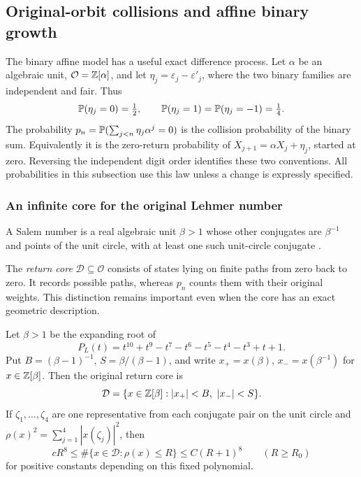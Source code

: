 \subsection{Original-orbit collisions and affine binary growth}
\label{sec:returns}

The binary affine model has a useful exact difference process.
Let $\alpha$ be an algebraic unit, $\mathcal O=\mathbb Z[\alpha]$, and let $\eta_j=\varepsilon_j-\varepsilon'_j$, where the two binary families are independent and fair.
Thus
\[
 \mathbb P(\eta_j=0)=\tfrac12,\qquad
 \mathbb P(\eta_j=1)=\mathbb P(\eta_j=-1)=\tfrac14.
\]
The probability $p_n=\mathbb P(\sum_{j<n}\eta_j\alpha^j=0)$ is the collision probability of the binary sum.
Equivalently it is the zero-return probability of $X_{j+1}=\alpha X_j+\eta_j$, started at zero.
Reversing the independent digit order identifies these two conventions.
All probabilities in this subsection use this law unless a change is expressly specified.

\subsubsection{An infinite core for the original Lehmer number}
\label{ret:core}

A Salem number is a real algebraic unit $\beta>1$ whose other conjugates are $\beta^{-1}$ and points of the unit circle, with at least one such unit-circle conjugate \cite[\S8]{Smy08}.
\begin{definition}\label{ret:return-core}
The \emph{return core} $\mathcal D\subseteq\mathcal O$ consists of states lying on finite paths from zero back to zero.
It records possible paths, whereas $p_n$ counts them with their original weights.
This distinction remains important even when the core has an exact geometric description.
\end{definition}

\begin{theorem}\label{ret:lehmer-core}
Let $\beta>1$ be the expanding root of
\[
 P_L(t)=t^{10}+t^9-t^7-t^6-t^5-t^4-t^3+t+1.
\]
Put $B=(\beta-1)^{-1}$, $S=\beta/(\beta-1)$, and write $x_+=x(\beta)$, $x_-=x(\beta^{-1})$ for $x\in\mathbb Z[\beta]$.
Then the original return core is
\begin{equation}\label{ret:strip}
 \mathcal D=\{x\in\mathbb Z[\beta]: |x_+|<B,\ |x_-|<S\}.
\end{equation}
If $\zeta_1,\ldots,\zeta_4$ are one representative from each conjugate pair on the unit circle and $\rho(x)^2=\sum_{j=1}^4|x(\zeta_j)|^2$, then
\[
 cR^8\leq\#\{x\in\mathcal D:\rho(x)\leq R\}
       \leq C(R+1)^8\qquad(R\geq R_0)
\]
for positive constants depending on this fixed polynomial.
\end{theorem}

